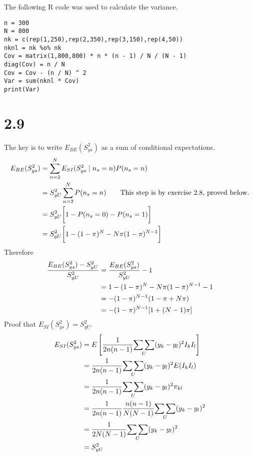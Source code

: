 \documentclass[12pt]{article}
\begin{document}
The following R code was used to calculate the variance.
\begin{verbatim}
n = 300
N = 800
nk = c(rep(1,250),rep(2,350),rep(3,150),rep(4,50))
nknl = nk %o% nk
Cov = matrix(1,800,800) * n * (n - 1) / N / (N - 1)
diag(Cov) = n / N
Cov = Cov - (n / N) ^ 2
Var = sum(nknl * Cov)
print(Var)
\end{verbatim}


\section*{2.9}
The key is to write $E_{BE}(S^2_{ys})$ as a sum of conditional
expectations.
\begin{align*}
E_{BE}(S^2_{ys})&=\sum_{n=2}^NE_{SI}(S^2_{ys}\mid n_s=n)P(n_s=n)\\
&=
S^2_{yU}\sum_{n=2}^NP(n_s=n)\qquad
\hbox{This step is by exercise 2.8, proved below.}\\
&=
S^2_{yU}\bigg[1-P(n_s=0)-P(n_s=1)\bigg]\\
&=
S^2_{yU}\bigg[1-(1-\pi)^N-N\pi(1-\pi)^{N-1}\bigg]\\
\end{align*}
Therefore
\begin{align*}
{E_{BE}(S^2_{ys})-S^2_{yU}\over S^2_{yU}}
&={E_{BE}(S^2_{ys})\over S^2_{yU}}-1\\
&=
1-(1-\pi)^N-N\pi(1-\pi)^{N-1}-1\\
&=
-(1-\pi)^{N-1}(1-\pi+N\pi)\\
&=
-(1-\pi)^{N-1}[1+(N-1)\pi]
\end{align*}
Proof that $E_{SI}(S^2_{ys})=S^2_{yU}$.
\begin{align*}
E_{SI}(S^2_{ys})&=E\left[
{1\over2n(n-1)}\underset{U}{\sum\sum}(y_k-y_l)^2I_kI_l
\right]\\
&=
{1\over2n(n-1)}\underset{U}{\sum\sum}(y_k-y_l)^2E(I_kI_l)\\
&=
{1\over2n(n-1)}\underset{U}{\sum\sum}(y_k-y_l)^2\pi_{kl}\\
&=
{1\over2n(n-1)}{n(n-1)\over N(N-1)}\underset{U}{\sum\sum}(y_k-y_l)^2\\
&=
{1\over2N(N-1)}\underset{U}{\sum\sum}(y_k-y_l)^2\\
&=S^2_{yU}
\end{align*}
\end{document}
